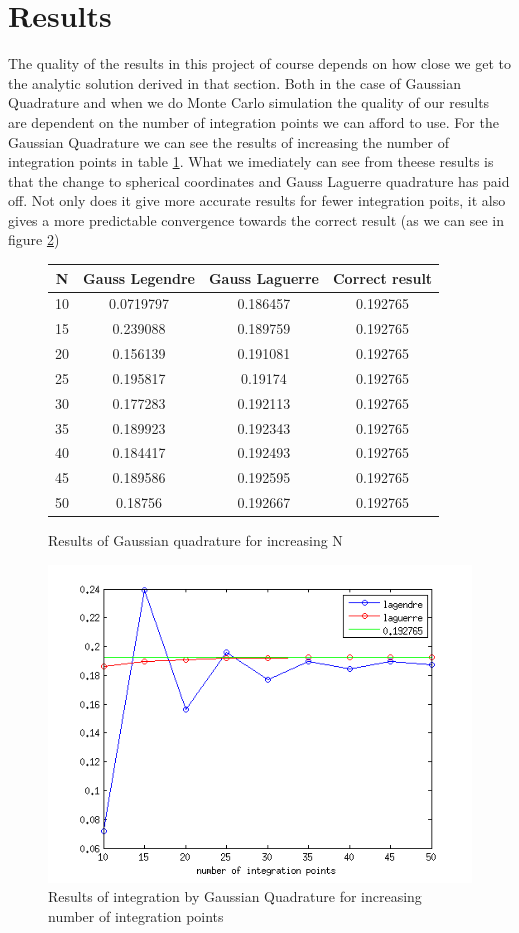 \documentclass[a4paper,english, 10pt, twoside]{article}
\begin{document}
\section*{Results}
The quality of the results in this project of course depends on how close we get to the analytic solution derived in that section. 
Both in the case of Gaussian Quadrature and when we do Monte Carlo simulation the quality of our results are dependent on the number 
of integration points we can afford to use. For the Gaussian Quadrature we can see the results of increasing the number of 
integration points in table \ref{table1}. What we imediately can see from theese results is that the change to spherical coordinates 
and Gauss Laguerre quadrature has paid off. Not only does it give more accurate results for fewer integration poits, it also 
gives a more predictable convergence towards the correct result (as we can see in figure \ref{figure2})
\begin{figure}[H]
\centering 
\begin{tabular}{|c|c|c|c|}
\hline
N &Gauss Legendre &Gauss Laguerre & Correct result \\
\hline
10 & 0.0719797 & 0.186457 & 0.192765  \\
15 & 0.239088 & 0.189759 & 0.192765  \\
20 & 0.156139 & 0.191081 & 0.192765  \\
25 & 0.195817 & 0.19174 & 0.192765  \\
30 & 0.177283 & 0.192113 & 0.192765  \\
35 & 0.189923 & 0.192343 & 0.192765  \\
40 & 0.184417 & 0.192493 & 0.192765 \\
45 & 0.189586 & 0.192595 & 0.192765  \\
50 & 0.18756  & 0.192667 & 0.192765 \\
\hline
\end{tabular}
\caption{Results of Gaussian quadrature for increasing N}
\label{table1}
\end{figure}
\begin{figure}[H]
 \centering
 \includegraphics[scale=0.7]{convergence_quadrature.png}
 \caption{Results of integration by Gaussian Quadrature for increasing number of integration points}
 \label{figure2}
\end{figure}
\end{document}
